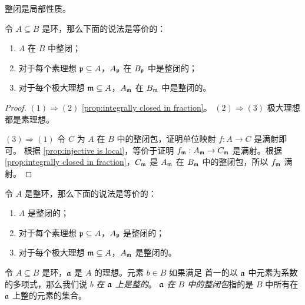 整闭是局部性质。

\begin{proposition}
  令 $A\subseteq B$ 是环，那么下面的说法是等价的：
  \begin{enumerate}
    \item $A$ 在 $B$ 中整闭；
    \item 对于每个素理想 $\mathfrak{p}\subseteq A$，$A_{\mathfrak{p}}$ 在 $B_{\mathfrak{p}}$
    中是整闭的；
    \item 对于每个极大理想 $\mathfrak{m}\subseteq A$，$A_{\mathfrak{m}}$ 在 $B_{\mathfrak{m}}$
    中是整闭的。
  \end{enumerate}
\end{proposition}
\begin{proof}
  $(1)\Rightarrow (2)$ \autoref{prop:integrally closed in fraction}。
  $(2)\Rightarrow (3)$ 极大理想都是素理想。

  $(3)\Rightarrow (1)$ 令 $C$ 为 $A$ 在 $B$ 中的整闭包，证明单位映射 $f:A\to C$ 是满射即可。
  根据 \autoref{prop:injective is local}，等价于证明 $f_{\mathfrak{m}}:A_{\mathfrak{m}}\to C_{\mathfrak{m}}$
  是满射。根据 \autoref{prop:integrally closed in fraction}，$C_{\mathfrak{m}}$ 是 $A_{\mathfrak{m}}$
  在 $B_{\mathfrak{m}}$ 中的整闭包，所以 $f_{\mathfrak{m}}$ 满射。
\end{proof}

\begin{corollary}
  令 $A$ 是整环，那么下面的说法是等价的：
  \begin{enumerate}
    \item $A$ 是整闭的；
    \item 对于每个素理想 $\mathfrak{p}\subseteq A$，$A_{\mathfrak{p}}$ 是整闭的；
    \item 对于每个极大理想 $\mathfrak{m}\subseteq A$，$A_{\mathfrak{m}}$ 是整闭的。
  \end{enumerate}
\end{corollary}

令 $A\subseteq B$ 是环，$\mathfrak{a}$ 是 $A$ 的理想。元素 $b\in B$ 如果满足
首一的以 $\mathfrak{a}$ 中元素为系数的多项式，那么我们说 $b$ \emph{在 $\mathfrak{a}$ 上是整的}。
$\mathfrak{a}$ \emph{在 $B$ 中的整闭包}指的是 $B$ 中所有在 $\mathfrak{a}$ 上整的元素的集合。

